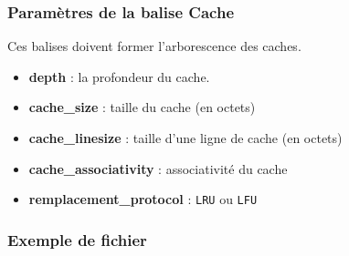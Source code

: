 \subsubsection{Paramètres de la balise Cache}
Ces balises doivent former l'arborescence des caches.

\begin{itemize}
  \item \textbf{depth} : la profondeur du cache.
  \item \textbf{cache\_size} : taille du cache (en octets)
  \item \textbf{cache\_linesize} : taille d'une ligne de cache (en octets)
  \item \textbf{cache\_associativity} : associativité du cache
  \item \textbf{remplacement\_protocol} : \verb?LRU? ou \verb?LFU?
\end{itemize}

\subsubsection{Exemple de fichier}

